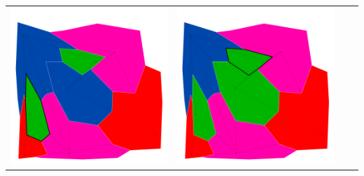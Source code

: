 \documentclass[10pt,a4paper]{article}
\begin{document}
\begin{tabular}{c c c c }
	\includegraphics[scale=.10]{../results/min_conflicts/map_build/minconf_I00007.pdf}&
	\includegraphics[scale=.10]{../results/min_conflicts/map_build/minconf_I00008.pdf}\\
	

\end{tabular}
\end{document}
